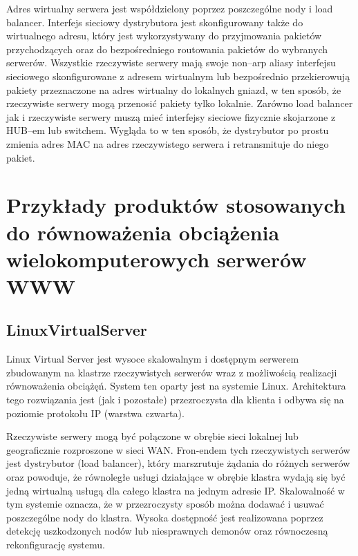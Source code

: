 Adres wirtualny serwera jest współdzielony poprzez poszczególne nody i load balancer. Interfejs sieciowy dystrybutora jest 
skonfigurowany także do wirtualnego adresu, który jest wykorzystywany do przyjmowania pakietów przychodzących oraz do 
bezpośredniego routowania pakietów do wybranych serwerów. Wszystkie rzeczywiste serwery mają swoje non--arp aliasy interfejsu 
sieciowego skonfigurowane z adresem wirtualnym lub bezpośrednio przekierowują pakiety przeznaczone na adres wirtualny do 
lokalnych gniazd, w ten sposób, że rzeczywiste serwery mogą przenosić pakiety tylko lokalnie. Zarówno load balancer jak i 
rzeczywiste serwery muszą mieć interfejsy sieciowe fizycznie skojarzone z HUB--em lub switchem. Wygląda to w ten sposób, że
dystrybutor po prostu zmienia adres MAC na adres rzeczywistego serwera i retransmituje do niego pakiet. 

\section{Przykłady produktów stosowanych do równoważenia obciążenia wielokomputerowych serwerów WWW}

\subsection{LinuxVirtualServer}

Linux Virtual Server jest wysoce skalowalnym i dostępnym serwerem zbudowanym na klastrze rzeczywistych serwerów wraz 
z możliwością realizacji równoważenia obciążęń. System ten oparty jest na systemie Linux. Architektura tego rozwiązania
jest (jak i pozostałe) przezroczysta dla klienta i odbywa się na poziomie protokołu IP (warstwa czwarta). 

Rzeczywiste serwery mogą być połączone w obrębie sieci lokalnej lub geograficznie rozproszone w sieci WAN. Fron-endem tych
rzeczywistych serwerów jest dystrybutor (load balancer), który marszrutuje żądania do różnych serwerów oraz powoduje, że
równoległe usługi działające w obrębie klastra wydają się być jedną wirtualną usługą dla całego klastra na jednym adresie IP.
Skalowalność w tym systemie oznacza, że w przezroczysty sposób można dodawać i usuwać poszczególne nody do klastra. Wysoka 
dostępność jest realizowana poprzez detekcję uszkodzonych nodów lub niesprawnych demonów oraz równoczesną rekonfigurację
systemu.

